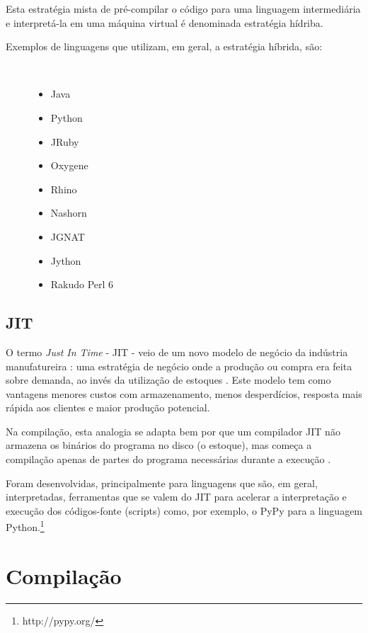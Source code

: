 Esta estratégia mista de pré-compilar o código para uma linguagem 
intermediária e interpretá-la em uma máquina virtual é denominada 
estratégia hídriba. 

\begin{description}
    \item[Exemplos de linguagens que utilizam, em geral, 
          a estratégia híbrida, são:]\
    \begin{itemize}
        \item Java  
        \item Python
        \item JRuby
        \item Oxygene
        \item Rhino
        \item Nashorn
        \item JGNAT
        \item Jython
        \item Rakudo Perl 6
    \end{itemize}
\end{description}

\subsection{JIT}

O termo \textit{Just In Time} - JIT - veio de um novo modelo de  negócio da
 indústria manufatureira : uma estratégia de negócio onde a produção 
ou compra era feita sobre demanda, ao invés da utilização de estoques
 \cite{ref10}. 
Este modelo tem como vantagens menores custos com armazenamento, 
menos desperdícios, resposta mais rápida aos clientes e maior 
produção potencial.

Na compilação, esta analogia se adapta bem por que um compilador JIT 
não armazena os binários do programa no disco (o estoque), mas começa 
a compilação apenas de partes do programa necessárias durante a execução
 \cite{ref11}.

Foram desenvolvidas, principalmente para linguagens que são, em geral, 
interpretadas, ferramentas que se valem do JIT para acelerar a interpretação
 e execução dos códigos-fonte (scripts) como, 
por exemplo, o PyPy para a linguagem Python.\footnote{http://pypy.org/}


\section{Compilação}

